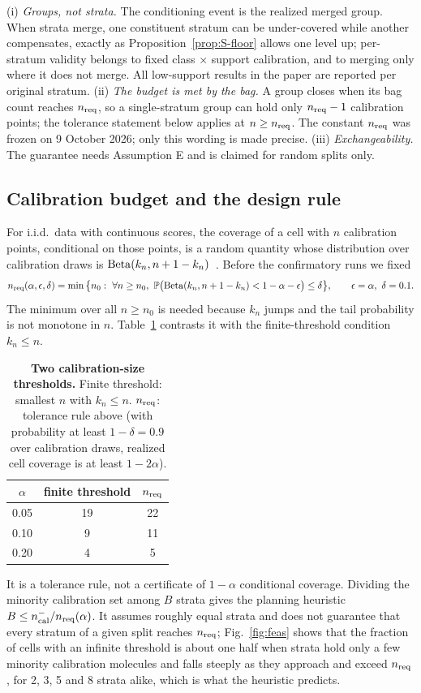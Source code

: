 \documentclass[10pt]{article}
\begin{document}
\begin{remark}\label{rem:S-limits}
(i) \emph{Groups, not strata.} The conditioning event is the realized merged group. When strata merge, one constituent stratum can be under-covered while another compensates, exactly as Proposition~\ref{prop:S-floor} allows one level up; per-stratum validity belongs to fixed class $\times$ support calibration, and to merging only where it does not merge. All low-support results in the paper are reported per original stratum. (ii) \emph{The budget is met by the bag.} A group closes when its bag count reaches $n_{\mathrm{req}}$, so a single-stratum group can hold only $n_{\mathrm{req}}-1$ calibration points; the tolerance statement below applies at $n\ge n_{\mathrm{req}}$. The constant $n_{\mathrm{req}}$ was frozen on 9 October 2026; only this wording is made precise. (iii) \emph{Exchangeability.} The guarantee needs Assumption E and is claimed for random splits only.
\end{remark}

\subsection{Calibration budget and the design rule}
For i.i.d.\ data with continuous scores, the coverage of a cell with $n$ calibration points, conditional on those points, is a random quantity whose distribution over calibration draws is $\mathrm{Beta}(k_n,n+1-k_n)$~\cite{vovk2012conditional}. Before the confirmatory runs we fixed
\[\nreq(\alpha,\epsilon,\delta)=\min\big\{n_0:\ \forall n\ge n_0,\ \Prob\big(\Beta(k_n,n+1-k_n)<1-\alpha-\epsilon\big)\le\delta\big\},\qquad\epsilon=\alpha,\ \delta=0.1 .\]
The minimum over all $n\ge n_0$ is needed because $k_n$ jumps and the tail probability is not monotone in $n$. Table~\ref{tab:nreq} contrasts it with the finite-threshold condition $k_n\le n$.
\begin{table}[!htbp]\centering\small
\caption{\textbf{Two calibration-size thresholds.} Finite threshold: smallest $n$ with $k_n\le n$. $n_{\mathrm{req}}$: tolerance rule above (with probability at least $1-\delta=0.9$ over calibration draws, realized cell coverage is at least $1-2\alpha$).}\label{tab:nreq}
\begin{tabular}{ccc}\toprule
$\alpha$ & finite threshold & $n_{\mathrm{req}}$\\\midrule
0.05 & 19 & 22\\ 0.10 & 9 & 11\\ 0.20 & 4 & 5\\\bottomrule
\end{tabular}\end{table}
It is a tolerance rule, not a certificate of $1-\alpha$ conditional coverage. Dividing the minority calibration set among $B$ strata gives the planning heuristic $B\le n^{-}_{\mathrm{cal}}/n_{\mathrm{req}}(\alpha)$. It assumes roughly equal strata and does not guarantee that every stratum of a given split reaches $n_{\mathrm{req}}$; Fig.~\ref{fig:feas} shows that the fraction of cells with an infinite threshold is about one half when strata hold only a few minority calibration molecules and falls steeply as they approach and exceed $n_{\mathrm{req}}$, for 2, 3, 5 and 8 strata alike, which is what the heuristic predicts.
\end{document}
